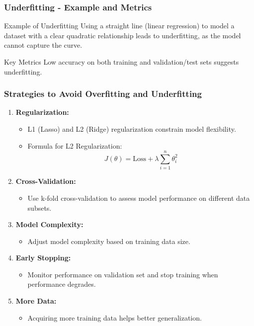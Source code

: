 \documentclass[aspectratio=169]{beamer}
\begin{document}
\begin{frame}[fragile]
    \frametitle{Underfitting - Example and Metrics}
    \begin{block}{Example of Underfitting}
        Using a straight line (linear regression) to model a dataset with a clear quadratic relationship leads to underfitting, as the model cannot capture the curve.
    \end{block}

    \begin{block}{Key Metrics}
        Low accuracy on both training and validation/test sets suggests underfitting.
    \end{block}
\end{frame}

\begin{frame}[fragile]
    \frametitle{Strategies to Avoid Overfitting and Underfitting}
    \begin{enumerate}
        \item \textbf{Regularization:}
        \begin{itemize}
            \item L1 (Lasso) and L2 (Ridge) regularization constrain model flexibility.
            \item Formula for L2 Regularization:
            \[
            J(\theta) = \text{Loss} + \lambda \sum_{i=1}^n \theta_i^2
            \]
        \end{itemize}
        
        \item \textbf{Cross-Validation:}
        \begin{itemize}
            \item Use k-fold cross-validation to assess model performance on different data subsets.
        \end{itemize}

        \item \textbf{Model Complexity:}
        \begin{itemize}
            \item Adjust model complexity based on training data size.
        \end{itemize}
        
        \item \textbf{Early Stopping:}
        \begin{itemize}
            \item Monitor performance on validation set and stop training when performance degrades.
        \end{itemize}
        
        \item \textbf{More Data:}
        \begin{itemize}
            \item Acquiring more training data helps better generalization.
        \end{itemize}
    \end{enumerate}
\end{frame}
\end{document}
